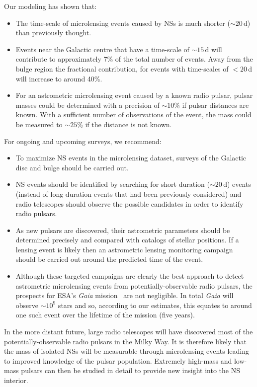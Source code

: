 \documentclass[iop,apj]{emulateapj}
\begin{document}
Our modeling has shown that:
\begin{itemize}
\item The time-scale of microlensing events caused by NSs is much shorter ($\sim 20$\,d) than previously thought.
\item Events near the Galactic centre that have a time-scale of $\sim 15$\,d will contribute to approximately 7\% of the total number of events. Away from the bulge region the fractional contribution, for events with time-scales of $< 20$\,d will increase to around 40\%.
\item For an astrometric microlensing event caused by a known radio pulsar, pulsar masses could be determined with a precision of $\sim 10$\% if pulsar distances are known. With a sufficient number of observations of the event, the mass could be measured to $\sim 25$\% if the distance is not known.
\end{itemize}

For ongoing and upcoming surveys, we recommend:
\begin{itemize}
\item To maximize NS events in the microlensing dataset, surveys of the Galactic disc and bulge should be carried out.
\item NS events should be identified by searching for short duration ($\sim 20$\,d) events (instead of long duration events that had been previously considered) and radio telescopes should observe the possible candidates in order to identify radio pulsars.
\item As new pulsars are discovered, their astrometric parameters should be determined precisely and compared with catalogs of stellar positions. If a lensing event is likely then an astrometric lensing monitoring campaign should be carried out around the predicted time of the event.
\item Although these targeted campaigns are clearly the best approach to
detect astrometric microlensing events from potentially-observable
radio pulsars, the prospects for ESA's \textit{Gaia}
mission~\citep{DeBruijne12} are not negligible. In total \textit{Gaia}
will observe $\sim10^9$ stars and so, according to our estimates, this
equates to around one such event over the lifetime of the mission
(five years).
\end{itemize}

In the more distant future, large radio telescopes will have discovered most of the potentially-observable 
radio pulsars in the Milky Way. 
It is therefore likely that the mass of isolated NSs will be measurable through 
microlensing events leading to improved knowledge of the pulsar population. Extremely high-mass and 
low-mass pulsars can then be studied in detail to provide new insight into the NS interior.
\end{document}
